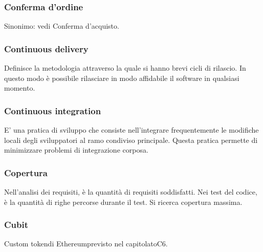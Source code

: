 \subsubsection*{Conferma d'ordine}
Sinonimo: vedi Conferma d'acquisto\glo.

\subsubsection*{Continuous delivery}
Definisce la metodologia attraverso la quale si hanno brevi cicli di rilascio. In questo modo è possibile rilasciare in modo affidabile il software in qualsiasi momento.

\subsubsection*{Continuous integration}
E’ una pratica di sviluppo che consiste nell’integrare frequentemente le modifiche locali degli sviluppatori al
ramo condiviso principale. Questa pratica permette di minimizzare problemi di integrazione corposa.

\subsubsection*{Copertura}
Nell'analisi dei requisiti, è la quantità di requisiti soddisfatti. Nei test del codice, è la quantità di righe percorse durante il test. Si ricerca copertura massima.

\subsubsection*{Cubit}
Custom token\glosp di Ethereum\glosp previsto nel capitolato\glosp C6.

